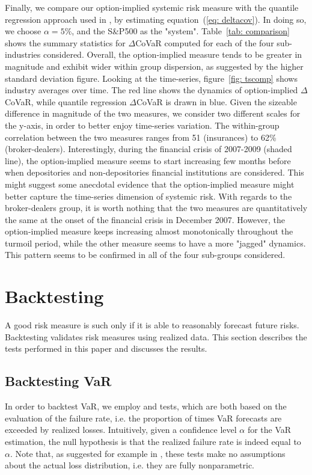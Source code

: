 \documentclass[11pt,a4paper,english]{article}
\begin{document}
Finally, we compare our option-implied systemic risk measure with the quantile regression approach used in \citet{Adrian2016}, by estimating equation~(\ref{eq: deltacov}). In doing so, we choose $\alpha=5\%$, and the S\&P500 as the "system". Table~\ref{tab: comparison} shows the summary statistics for $\Delta$CoVaR computed for each of the four sub-industries considered. Overall, the option-implied measure tends to be greater in magnitude and exhibit wider within group dispersion, as suggested by the higher standard deviation figure. Looking at the time-series, figure~\ref{fig: tscomp} shows industry averages over time. The red line shows the dynamics of option-implied $\Delta$CoVaR, while quantile regression $\Delta$CoVaR is drawn in blue. Given the sizeable difference in magnitude of the two measures, we consider two different scales for the y-axis, in order to better enjoy time-series variation. The within-group correlation between the two measures ranges from 51 (insurances) to 62\% (broker-dealers). Interestingly, during the financial crisis of 2007-2009 (shaded line), the option-implied measure seems to start increasing few months before when depositories and non-depositories financial institutions are considered. This might suggest some anecdotal evidence that the option-implied measure might better capture the time-series dimension of systemic risk. With regards to the broker-dealers group, it is worth nothing that the two measures are quantitatively the same at the onset of the financial crisis in December 2007. However, the option-implied measure keeps increasing almost monotonically throughout the turmoil period, while the other measure seems to have a more "jagged" dynamics. This pattern seems to be confirmed in all of the four sub-groups considered.

\section{Backtesting}
\label{sec: backtesting}
A good risk measure is such only if it is able to reasonably forecast future risks. Backtesting validates risk measures using realized data. This section describes the tests performed in this paper and discusses the results.

\subsection{Backtesting VaR}
\label{sec: varback}
In order to backtest VaR, we employ \citet{Kupiec1995} and \citet{Christoffersen1998} tests, which are both based on the evaluation of the failure rate, i.e. the proportion of times VaR forecasts are exceeded by realized losses. Intuitively, given a confidence level $\alpha$ for the VaR estimation, the null hypothesis is that the realized failure rate is indeed equal to $\alpha$. Note that, as suggested for example in \citet{Jorion2007}, these tests make no assumptions about the actual loss distribution, i.e. they are fully nonparametric. 
\end{document}
